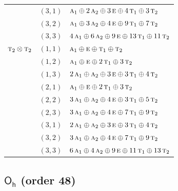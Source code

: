 \documentclass[11pt]{article}
\newcommand{\grp}[1]{\mathsf{#1}}
\newcommand{\irr}[1]{\text{\normalfont\scshape #1}}
\begin{document}
\begin{longtable}{p{} c p{}}
 & $(3,1)$ & $\irr{a}_{1}\oplus 2\,\irr{a}_{2}\oplus 3\,\irr{e}\oplus 4\,\irr{t}_{1}\oplus 3\,\irr{t}_{2}$\\

 & $(3,2)$ & $\irr{a}_{1}\oplus 3\,\irr{a}_{2}\oplus 4\,\irr{e}\oplus 9\,\irr{t}_{1}\oplus 7\,\irr{t}_{2}$\\

 & $(3,3)$ & $4\,\irr{a}_{1}\oplus 6\,\irr{a}_{2}\oplus 9\,\irr{e}\oplus 13\,\irr{t}_{1}\oplus 11\,\irr{t}_{2}$\\

\hline

$\irr{t}_{2}\otimes \irr{t}_{2}$ & $(1,1)$ & $\irr{a}_{1}\oplus \irr{e}\oplus \irr{t}_{1}\oplus \irr{t}_{2}$\\

 & $(1,2)$ & $\irr{a}_{1}\oplus \irr{e}\oplus 2\,\irr{t}_{1}\oplus 3\,\irr{t}_{2}$\\

 & $(1,3)$ & $2\,\irr{a}_{1}\oplus \irr{a}_{2}\oplus 3\,\irr{e}\oplus 3\,\irr{t}_{1}\oplus 4\,\irr{t}_{2}$\\

 & $(2,1)$ & $\irr{a}_{1}\oplus \irr{e}\oplus 2\,\irr{t}_{1}\oplus 3\,\irr{t}_{2}$\\

 & $(2,2)$ & $3\,\irr{a}_{1}\oplus \irr{a}_{2}\oplus 4\,\irr{e}\oplus 3\,\irr{t}_{1}\oplus 5\,\irr{t}_{2}$\\

 & $(2,3)$ & $3\,\irr{a}_{1}\oplus \irr{a}_{2}\oplus 4\,\irr{e}\oplus 7\,\irr{t}_{1}\oplus 9\,\irr{t}_{2}$\\

 & $(3,1)$ & $2\,\irr{a}_{1}\oplus \irr{a}_{2}\oplus 3\,\irr{e}\oplus 3\,\irr{t}_{1}\oplus 4\,\irr{t}_{2}$\\

 & $(3,2)$ & $3\,\irr{a}_{1}\oplus \irr{a}_{2}\oplus 4\,\irr{e}\oplus 7\,\irr{t}_{1}\oplus 9\,\irr{t}_{2}$\\

 & $(3,3)$ & $6\,\irr{a}_{1}\oplus 4\,\irr{a}_{2}\oplus 9\,\irr{e}\oplus 11\,\irr{t}_{1}\oplus 13\,\irr{t}_{2}$\\

\hline

\end{longtable}

\subsection*{$\grp{O_{h}}$ \quad (order 48)}
\end{document}
